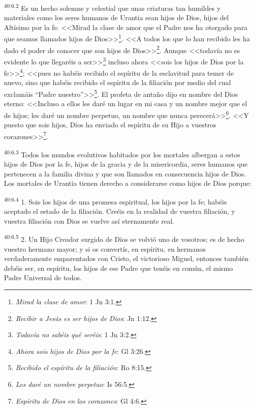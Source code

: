 \par
\textsuperscript{40:6.2} Es un hecho solemne y celestial que unas criaturas tan humildes y materiales como los seres humanos de Urantia sean hijos de Dios, hijos del Altísimo por la fe. <<Mirad la clase de amor que el Padre nos ha otorgado para que seamos llamados hijos de Dios>>\footnote{\textit{Mirad la clase de amor}: 1 Jn 3:1.}. <<A todos los que lo han recibido les ha dado el poder de conocer que son hijos de Dios>>\footnote{\textit{Recibir a Jesús es ser hijos de Dios}: Jn 1:12.}. Aunque <<todavía no es evidente lo que llegaréis a ser>>\footnote{\textit{Todavía no sabéis qué seréis}: 1 Jn 3:2.} incluso ahora <<sois los hijos de Dios por la fe>>\footnote{\textit{Ahora sois hijos de Dios por la fe}: Gl 3:26.}; <<pues no habéis recibido el espíritu de la esclavitud para temer de nuevo, sino que habéis recibido el espíritu de la filiación por medio del cual exclamáis ``Padre nuestro''>>\footnote{\textit{Recibido el espíritu de la filiación}: Ro 8:15.}. El profeta de antaño dijo en nombre del Dios eterno: <<Incluso a ellos les daré un lugar en mi casa y un nombre mejor que el de hijos; les daré un nombre perpetuo, un nombre que nunca perecerá>>\footnote{\textit{Les daré un nombre perpetuo}: Is 56:5.}. <<Y puesto que sois hijos, Dios ha enviado el espíritu de su Hijo a vuestros corazones>>\footnote{\textit{Espíritu de Dios en los corazones}: Gl 4:6.}.

\par
\textsuperscript{40:6.3} Todos los mundos evolutivos habitados por los mortales albergan a estos hijos de Dios por la fe, hijos de la gracia y de la misericordia, seres humanos que pertenecen a la familia divina y que son llamados en consecuencia hijos de Dios. Los mortales de Urantia tienen derecho a considerarse como hijos de Dios porque:

\par
\textsuperscript{40:6.4} 1. Sois los hijos de una promesa espiritual, los hijos por la fe; habéis aceptado el estado de la filiación. Creéis en la realidad de vuestra filiación, y vuestra filiación con Dios se vuelve así eternamente real.

\par
\textsuperscript{40:6.5} 2. Un Hijo Creador surgido de Dios se volvió uno de vosotros; es de hecho vuestro hermano mayor; y si os convertís, en espíritu, en hermanos verdaderamente emparentados con Cristo, el victorioso Miguel, entonces también debéis ser, en espíritu, los hijos de ese Padre que tenéis en común, el mismo Padre Universal de todos.


